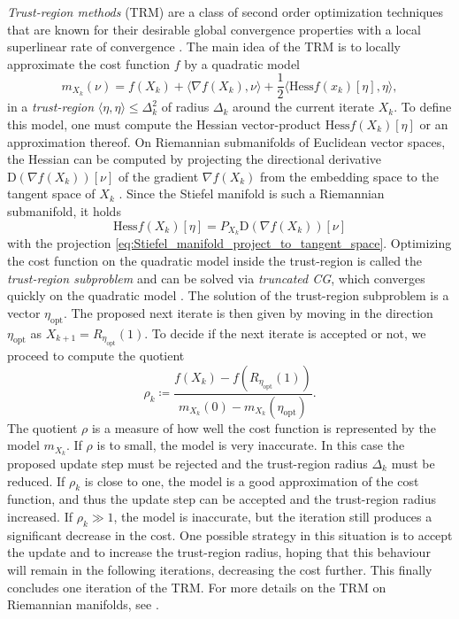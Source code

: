\textit{Trust-region methods} (TRM) are a class of second order optimization techniques that are known for their desirable global convergence properties with a local superlinear rate of convergence \cite{cite:optimization_on_matrix_manifolds, cite:trust_region_methods_on_riemannian_manifolds}. The main idea of the TRM is to locally approximate the cost function $f$ by a quadratic model
\begin{equation}
	m_{X_k}(\nu) = f(X_k) + \langle \nabla f(X_k), \nu\rangle + \frac{1}{2}\langle \text{Hess}f(x_k)[\eta], \eta\rangle,
\end{equation}
in a \textit{trust-region} $\langle\eta,\eta\rangle \le \Delta_k^2$ of radius $\Delta_k$ around the current iterate $X_k$. To define this model, one must compute the Hessian vector-product $\text{Hess}f(X_k)[\eta]$ or an approximation thereof. On Riemannian submanifolds of Euclidean vector spaces, the Hessian can be computed by projecting the directional derivative $\text{D}(\nabla f(X_k))\left[\nu\right]$ of the gradient $\nabla f(X_k)$ from the embedding space to the tangent space of $X_k$ \cite{cite:optimization_on_matrix_manifolds}. Since the Stiefel manifold is such a Riemannian submanifold, it holds
\begin{equation}
	\label{eq:hessian_vector_product}
	\text{Hess}f(X_k)[\eta] = P_{X_k} \text{D}(\nabla f(X_k))\left[\nu\right]
\end{equation}
with the projection \eqref{eq:Stiefel_manifold_project_to_tangent_space}. Optimizing the cost function on the quadratic model inside the trust-region is called the \textit{trust-region subproblem} and can be solved via \textit{truncated CG}, which converges quickly on the quadratic model \cite{cite:optimization_on_matrix_manifolds}. The solution of the trust-region subproblem is a vector $\eta_\text{opt}$. The proposed next iterate is then given by moving in the direction $\eta_\text{opt}$ as $X_{k+1} = R_{\eta_\text{opt}}(1)$. To decide if the next iterate is accepted or not, we proceed to compute the quotient
\begin{equation}
	\rho_k \coloneqq \frac{f(X_k) - f(R_{\eta_\text{opt}}(1))}{m_{X_k}(0) - m_{X_k}(\eta_\text{opt})}.
\end{equation}
The quotient $\rho$ is a measure of how well the cost function is represented by the model $m_{X_k}$. If $\rho$ is to small, the model is very inaccurate. In this case the proposed update step must be rejected and the trust-region radius $\Delta_k$ must be reduced. If $\rho_k$ is close to one, the model is a good approximation of the cost function, and thus the update step can be accepted and the trust-region radius increased. If $\rho_k \gg 1$, the model is inaccurate, but the iteration still produces a significant decrease in the cost. One possible strategy in this situation is to accept the update and to increase the trust-region radius, hoping that this behaviour will remain in the following iterations, decreasing the cost further. This finally concludes one iteration of the TRM. For more details on the TRM on Riemannian manifolds, see \cite{cite:optimization_on_matrix_manifolds, cite:trust_region_methods_on_riemannian_manifolds, cite:pymanopt}.